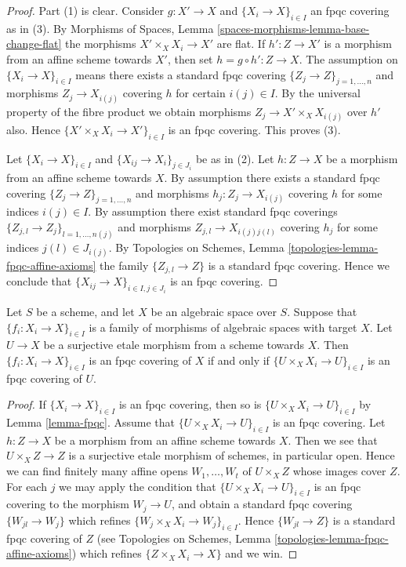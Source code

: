 \begin{proof}
Part (1) is clear. Consider $g : X' \to X$ and
$\{X_i \to X\}_{i\in I}$ an fpqc covering as in (3). By
Morphisms of Spaces, Lemma \ref{spaces-morphisms-lemma-base-change-flat}
the morphisms $X' \times_X X_i \to X'$
are flat. If $h' : Z \to X'$ is a morphism from an affine scheme
towards $X'$, then set $h = g \circ h' : Z \to X$. The assumption
on $\{X_i \to X\}_{i\in I}$ means there exists a standard fpqc covering
$\{Z_j \to Z\}_{j = 1, \ldots, n}$ and morphisms $Z_j \to X_{i(j)}$ covering
$h$ for certain $i(j) \in I$. By the universal property of the fibre product
we obtain morphisms $Z_j \to X' \times_X X_{i(j)}$ over $h'$ also.
Hence $\{X' \times_X X_i \to X'\}_{i\in I}$ is an fpqc covering.
This proves (3).

\medskip\noindent
Let $\{X_i \to X\}_{i\in I}$ and $\{X_{ij} \to X_i\}_{j\in J_i}$ be as
in (2). Let $h : Z \to X$ be a morphism from an affine scheme towards $X$.
By assumption there exists a standard fpqc covering
$\{Z_j \to Z\}_{j = 1, \ldots, n}$ and morphisms $h_j : Z_j \to X_{i(j)}$
covering $h$ for some indices $i(j) \in I$. By assumption there exist
standard fpqc coverings
$\{Z_{j, l} \to Z_j\}_{l = 1, \ldots, n(j)}$
and morphisms $Z_{j, l} \to X_{i(j)j(l)}$ covering
$h_j$ for some indices $j(l) \in J_{i(j)}$. By
Topologies on Schemes, Lemma \ref{topologies-lemma-fpqc-affine-axioms}
the family $\{Z_{j, l} \to Z\}$ is a standard fpqc covering.
Hence we conclude that $\{X_{ij} \to X\}_{i \in I, j\in J_i}$
is an fpqc covering.
\end{proof}

\begin{lemma}
\label{lemma-recognize-fpqc-covering}
Let $S$ be a scheme, and let $X$ be an algebraic space over $S$.
Suppose that $\{f_i : X_i \to X\}_{i \in I}$ is a family of morphisms of
algebraic spaces with target $X$. Let $U \to X$ be a surjective
etale morphism from a scheme towards $X$. Then
$\{f_i : X_i \to X\}_{i \in I}$ is an fpqc covering of $X$ if and only
if $\{U \times_X X_i \to U\}_{i \in I}$ is an fpqc covering of $U$.
\end{lemma}

\begin{proof}
If $\{X_i \to X\}_{i \in I}$ is an fpqc covering, then so is
$\{U \times_X X_i \to U\}_{i \in I}$ by Lemma \ref{lemma-fpqc}.
Assume that $\{U \times_X X_i \to U\}_{i \in I}$ is an fpqc covering.
Let $h : Z \to X$ be a morphism from an affine scheme towards $X$.
Then we see that $U \times_X Z \to Z$ is a surjective etale morphism
of schemes, in particular open. Hence we can find finitely many affine opens
$W_1, \ldots, W_t$ of $U \times_X Z$ whose images cover $Z$.
For each $j$ we may apply the condition that
$\{U \times_X X_i \to U\}_{i \in I}$ is an fpqc covering
to the morphism $W_j \to U$, and obtain a standard fpqc covering
$\{W_{jl} \to W_j\}$ which refines $\{W_j \times_X X_i \to W_j\}_{i \in I}$.
Hence $\{W_{jl} \to Z\}$ is a standard fpqc covering of $Z$
(see Topologies on Schemes, Lemma \ref{topologies-lemma-fpqc-affine-axioms})
which refines $\{Z \times_X X_i \to X\}$ and we win.
\end{proof}

